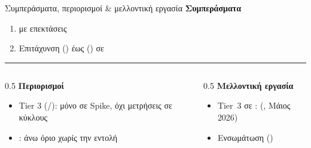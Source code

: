 \begin{frame}{Συμπεράσματα, περιορισμοί \& μελλοντική εργασία}
  \textbf{Συμπεράσματα}
  \begin{enumerate}
    \item {} με επεκτάσεις 
    \item Επιτάχυνση \KEM {} () έως  () σε \instret
  \end{enumerate}
  \vspace{0.8em}
  {\color{gray!45}\hrule}
  \vspace{1.5em}
  \pause
  \begin{columns}[T,onlytextwidth]
    \begin{column}{0.5\textwidth}
      \textbf{Περιορισμοί}
      \begin{itemize}
        \item Tier 3 (\Zvbc/\Zvbb): μόνο σε Spike, όχι μετρήσεις σε κύκλους
        \item {}: άνω όριο χωρίς την εντολή 
      \end{itemize}
    \end{column}
    \begin{column}{0.5\textwidth}
      \textbf{Μελλοντική εργασία}
      \begin{itemize}
        \item Tier~3 σε :  (\Zvbc, Μάιος 2026)
        \item Ενσωμάτωση  ()
      \end{itemize}
    \end{column}
  \end{columns}
\end{frame}
